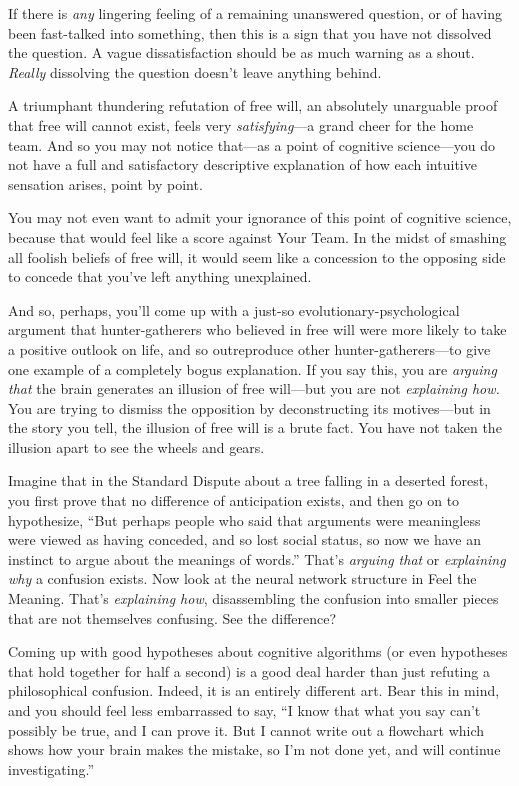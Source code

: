 {
 If there is \textit{any} lingering feeling of a remaining
unanswered question, or of having been fast-talked into something, then
this is a sign that you have not dissolved the question. A vague
dissatisfaction should be as much warning as a shout. \textit{Really}
dissolving the question doesn't leave anything behind.}

{
 A triumphant thundering refutation of free will, an absolutely
unarguable proof that free will cannot exist, feels very
\textit{satisfying}{}---a grand cheer for the home team. And so you may
not notice that---as a point of cognitive science---you do not have a
full and satisfactory descriptive explanation of how each intuitive
sensation arises, point by point.}

{
 You may not even want to admit your ignorance of this point of
cognitive science, because that would feel like a score against Your
Team. In the midst of smashing all foolish beliefs of free will, it
would seem like a concession to the opposing side to concede that
you've left anything unexplained.}

{
 And so, perhaps, you'll come up with a just-so
evolutionary-psychological argument that hunter-gatherers who believed
in free will were more likely to take a positive outlook on life, and
so outreproduce other hunter-gatherers---to give one example of a
completely bogus explanation. If you say this, you are \textit{arguing
that} the brain generates an illusion of free will---but you are not
\textit{explaining how.} You are trying to dismiss the opposition by
deconstructing its motives---but in the story you tell, the illusion of
free will is a brute fact. You have not taken the illusion apart to see
the wheels and gears.}

{
 Imagine that in the Standard Dispute about a tree falling in a
deserted forest, you first prove that no difference of anticipation
exists, and then go on to hypothesize, ``But perhaps
people who said that arguments were meaningless were viewed as having
conceded, and so lost social status, so now we have an instinct to
argue about the meanings of words.''
That's \textit{arguing that} or \textit{explaining why}
a confusion exists. Now look at the neural network structure in Feel
the Meaning. That's \textit{explaining how},
disassembling the confusion into smaller pieces that are not themselves
confusing. See the difference?}

{
 Coming up with good hypotheses about cognitive algorithms (or even
hypotheses that hold together for half a second) is a good deal harder
than just refuting a philosophical confusion. Indeed, it is an entirely
different art. Bear this in mind, and you should feel less embarrassed
to say, ``I know that what you say
can't possibly be true, and I can prove it. But I
cannot write out a flowchart which shows how your brain makes the
mistake, so I'm not done yet, and will continue
investigating.''}

